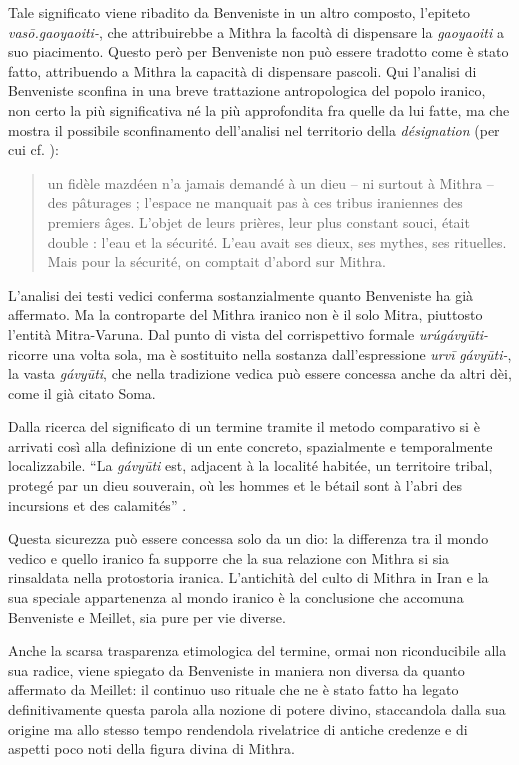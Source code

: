 \documentclass[output=paper]{langsci/langscibook}
\begin{document}
Tale significato viene ribadito da Benveniste in un altro composto, l’epiteto \textit{vasō.gaoyaoiti-}, che attribuirebbe a Mithra la facoltà di dispensare la \textit{gaoyaoiti} a suo piacimento. Questo però per Benveniste non può essere tradotto come è stato fatto, attribuendo a Mithra la capacità di dispensare pascoli. Qui l’analisi di Benveniste sconfina in una breve trattazione antropologica del popolo iranico, non certo la più significativa né la più approfondita fra quelle da lui fatte, ma che mostra il possibile sconfinamento dell’analisi nel territorio della \textit{désignation} (per cui cf. \citealt[10]{benveniste_vocabulaire_1969}):

\begin{quote}
    un fidèle mazdéen n’a jamais demandé à un dieu – ni surtout à Mithra – des pâturages ; l’espace ne manquait pas à ces tribus iraniennes des premiers âges. L’objet de leurs prières, leur plus constant souci, était double : l’eau et la sécurité. L’eau avait ses dieux, ses mythes, ses rituelles. Mais pour la sécurité, on comptait d’abord sur Mithra. \citep[282]{benveniste_mithra_2015}
\end{quote}

L’analisi dei testi vedici conferma sostanzialmente quanto Benveniste ha già affermato. Ma la controparte del Mithra iranico non è il solo Mitra, piuttosto l’entità Mitra-Varuna. Dal punto di vista del corrispettivo formale \textit{urúgávyūti-} ricorre una volta sola, ma è sostituito nella sostanza dall'espressione \textit{urvī} \textit{gávyūti-}, la vasta \textit{gávyūti}, che nella tradizione vedica può essere concessa anche da altri dèi, come il già citato Soma.

Dalla ricerca del significato di un termine tramite il metodo comparativo si è arrivati così alla definizione di un ente concreto, spazialmente e temporalmente localizzabile. “La \textit{gávyūti} est, adjacent à la localité habitée, un territoire tribal, protegé par un dieu souverain, où les hommes et le bétail sont à l’abri des incursions et des calamités” \citep[284]{benveniste_mithra_2015}.

Questa sicurezza può essere concessa solo da un dio: la differenza tra il mondo vedico e quello iranico fa supporre che la sua relazione con Mithra si sia rinsaldata nella protostoria iranica. L’antichità del culto di Mithra in Iran e la sua speciale appartenenza al mondo iranico è la conclusione che accomuna Benveniste e Meillet, sia pure per vie diverse.

Anche la scarsa trasparenza etimologica del termine, ormai non riconducibile alla sua radice, viene spiegato da Benveniste in maniera non diversa da quanto affermato da Meillet: il continuo uso rituale che ne è stato fatto ha legato definitivamente questa parola alla nozione di potere divino, staccandola dalla sua origine ma allo stesso tempo rendendola rivelatrice di antiche credenze e di aspetti poco noti della figura divina di Mithra.
\end{document}
